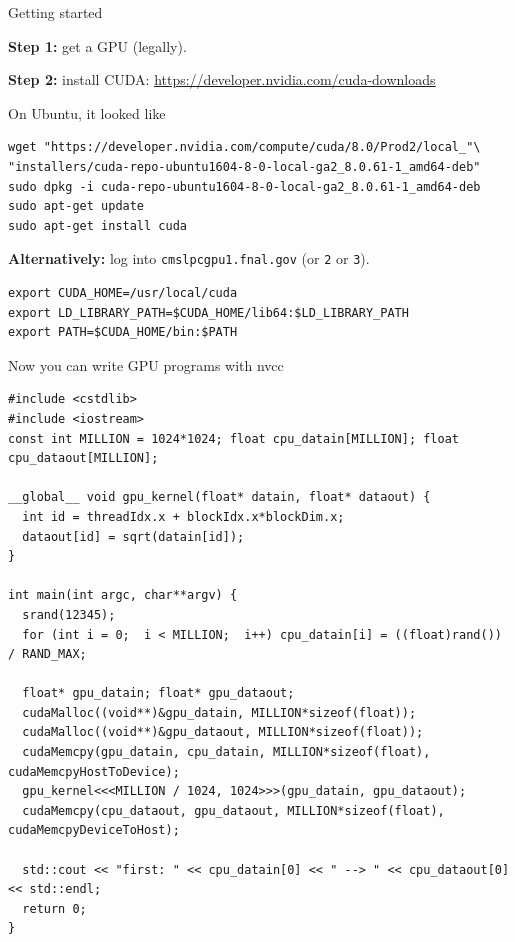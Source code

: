 \documentclass[aspectratio=169]{beamer}
\begin{document}
\begin{frame}[fragile]{Getting started}
\vspace{0.5 cm}
\large

{\bf Step 1:} get a GPU (legally).

\vspace{0.25 cm}
{\bf Step 2:} install CUDA: \textcolor{blue}{\normalsize \underline{\url{https://developer.nvidia.com/cuda-downloads}}}

\vspace{0.5 cm}
On Ubuntu, it looked like
\small
\begin{verbatim}
wget "https://developer.nvidia.com/compute/cuda/8.0/Prod2/local_"\
"installers/cuda-repo-ubuntu1604-8-0-local-ga2_8.0.61-1_amd64-deb"
sudo dpkg -i cuda-repo-ubuntu1604-8-0-local-ga2_8.0.61-1_amd64-deb  
sudo apt-get update
sudo apt-get install cuda
\end{verbatim}

\large
\vspace{0.5 cm}
{\bf Alternatively:} log into {\tt cmslpcgpu1.fnal.gov} (or {\tt 2} or {\tt 3}).

\small
\begin{verbatim}
export CUDA_HOME=/usr/local/cuda
export LD_LIBRARY_PATH=$CUDA_HOME/lib64:$LD_LIBRARY_PATH
export PATH=$CUDA_HOME/bin:$PATH
\end{verbatim}
\end{frame}

\begin{frame}[fragile]{Now you can write GPU programs with nvcc}
\vspace{0.25 cm}
\scriptsize
\begin{verbatim}
#include <cstdlib>
#include <iostream>
const int MILLION = 1024*1024; float cpu_datain[MILLION]; float cpu_dataout[MILLION];

__global__ void gpu_kernel(float* datain, float* dataout) {
  int id = threadIdx.x + blockIdx.x*blockDim.x;
  dataout[id] = sqrt(datain[id]);
}

int main(int argc, char**argv) {
  srand(12345);
  for (int i = 0;  i < MILLION;  i++) cpu_datain[i] = ((float)rand()) / RAND_MAX;

  float* gpu_datain; float* gpu_dataout;
  cudaMalloc((void**)&gpu_datain, MILLION*sizeof(float));
  cudaMalloc((void**)&gpu_dataout, MILLION*sizeof(float));
  cudaMemcpy(gpu_datain, cpu_datain, MILLION*sizeof(float), cudaMemcpyHostToDevice);
  gpu_kernel<<<MILLION / 1024, 1024>>>(gpu_datain, gpu_dataout);
  cudaMemcpy(cpu_dataout, gpu_dataout, MILLION*sizeof(float), cudaMemcpyDeviceToHost);

  std::cout << "first: " << cpu_datain[0] << " --> " << cpu_dataout[0] << std::endl;
  return 0;
}
\end{verbatim}
\end{frame}
\end{document}
